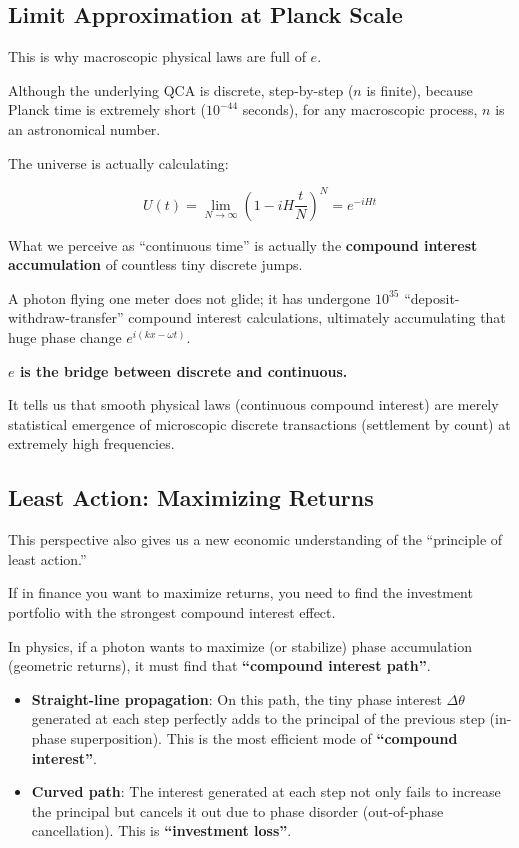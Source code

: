 \documentclass[11pt,a4paper,twoside]{book}
\begin{document}
\subsection{Limit Approximation at Planck Scale}

This is why macroscopic physical laws are full of $e$.

Although the underlying QCA is discrete, step-by-step ($n$ is finite), because Planck time is extremely short ($10^{-44}$ seconds), for any macroscopic process, $n$ is an astronomical number.

The universe is actually calculating:

$$U(t) = \lim_{N \to \infty} \left(1 - i H \frac{t}{N}\right)^N = e^{-iHt}$$

What we perceive as ``continuous time'' is actually the \textbf{compound interest accumulation} of countless tiny discrete jumps.

A photon flying one meter does not glide; it has undergone $10^{35}$ ``deposit-withdraw-transfer'' compound interest calculations, ultimately accumulating that huge phase change $e^{i(kx-\omega t)}$.

\textbf{$e$ is the bridge between discrete and continuous.}

It tells us that smooth physical laws (continuous compound interest) are merely statistical emergence of microscopic discrete transactions (settlement by count) at extremely high frequencies.

\subsection{Least Action: Maximizing Returns}

This perspective also gives us a new economic understanding of the ``principle of least action.''

If in finance you want to maximize returns, you need to find the investment portfolio with the strongest compound interest effect.

In physics, if a photon wants to maximize (or stabilize) phase accumulation (geometric returns), it must find that \textbf{``compound interest path''}.

\begin{itemize}
\item \textbf{Straight-line propagation}: On this path, the tiny phase interest $\Delta \theta$ generated at each step perfectly adds to the principal of the previous step (in-phase superposition). This is the most efficient mode of \textbf{``compound interest''}.

\item \textbf{Curved path}: The interest generated at each step not only fails to increase the principal but cancels it out due to phase disorder (out-of-phase cancellation). This is \textbf{``investment loss''}.
\end{itemize}
\end{document}
